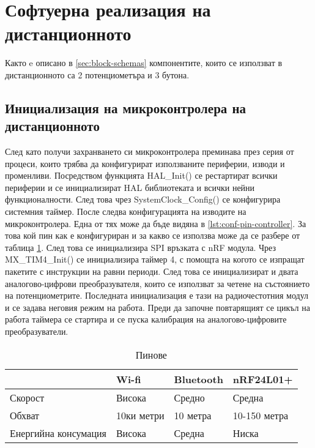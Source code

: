 \section{Софтуерна реализация на дистанционното}
\label{sec:software-controller}

Както e описано в \cref{sec:block-schemas} компонентите, които се използват в дистанционното са 2 потенциометъра и 3 бутона.


\subsection{Инициализация на микроконтролера на дистанционното}
\label{ssec:init-controller}

След като получи захранването си микроконтролера преминава през серия от процеси, които трябва да конфигурират използваните периферии, изводи и променливи. Посредством функцията HAL\_Init() се рестартират всички периферии и се инициализират HAL библиотеката и всички нейни функционалности. След това чрез SystemClock\_Config() се конфигурира системния таймер. После следва конфигурацията на изводите на микроконтролера. Една от тях може да бъде видяна в \autoref{lst:conf-pin-controller}. За това кой пин как е конфигуриран и за какво се използва може да се разбере от таблица \cref{table:pins-controller}. След това се инициализира SPI връзката с nRF модула. Чрез MX\_TIM4\_Init() се инициализира таймер 4, с помощта на когото се изпращат пакетите с инструкции на равни периоди. След това се инициализират и двата аналогово-цифрови преобразувателя, които се използват за четене на състоянието на потенциометрите. Последната инициализация е тази на радиочестотния модул и се задава неговия режим на работа. Преди да започне повтарящият се цикъл на работа таймера се стартира и се пуска калибрация на аналогово-цифровите преобразуватели.



\begin{table}[H]
    \centering
    \begin{tabular}{| m{4cm} | m{} | m{} | m{} |}
        \hline
        & Wi-fi & Bluetooth & nRF24L01+ \\
        \hline
        Скорост &  Висока & Средно & Средна \\
        \hline
        Обхват & 10ки метри & 10 метра & 10-150 метра \\
        \hline
        Енергийна консумация & Висока & Средна & Ниска\\
        \hline
    \end{tabular}
    \caption{Пинове}
    \label{table:pins-controller}
\end{table}


